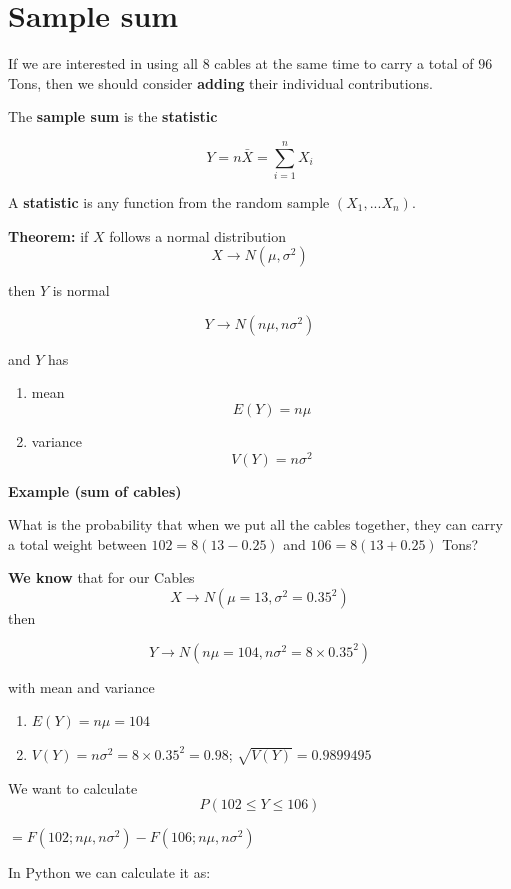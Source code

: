 \documentclass[
]{book}
\providecommand{\tightlist}{%
  \setlength{\itemsep}{0pt}\setlength{\parskip}{0pt}}
\begin{document}
\hypertarget{sample-sum}{%
\section{Sample sum}\label{sample-sum}}

If we are interested in using all \(8\) cables at the same time to carry a total of \(96\) Tons, then we should consider \textbf{adding} their individual contributions.

The \textbf{sample sum} is the \textbf{statistic}

\[Y=n \bar{X}=\sum_{i=1}^n X_i\]

A \textbf{statistic} is any function from the random sample \((X_1, ... X_n)\).

\textbf{Theorem:} if \(X\) follows a normal distribution
\[X \rightarrow N(\mu, \sigma^2)\]

then \(Y\) is normal

\[Y \rightarrow N(n\mu, n\sigma^2)\]

and \(Y\) has

\begin{enumerate}
\def\labelenumi{\arabic{enumi})}
\tightlist
\item
  mean \[E(Y)=n\mu\]
\item
  variance \[V(Y)=n\sigma^2\]
\end{enumerate}

\textbf{Example (sum of cables)}

What is the probability that when we put all the cables together, they can carry a total weight between \(102=8(13 - 0.25)\) and \(106=8(13+ 0.25)\) Tons?

\textbf{We know} that for our Cables \[X \rightarrow N(\mu=13, \sigma^2=0.35^2)\] then

\[Y \rightarrow N(n\mu=104, n\sigma^2=8\times 0.35^2)\]

with mean and variance

\begin{enumerate}
\def\labelenumi{\arabic{enumi})}
\tightlist
\item
  \(E(Y)=n\mu=104\)
\item
  \(V(Y)=n\sigma^2=8\times 0.35^2=0.98\); \(\sqrt{V(Y)}=0.9899495\)
\end{enumerate}

We want to calculate \[P(102 \leq Y \leq 106)\]

\(=F(102; n\mu, n\sigma^2)-F(106; n\mu, n\sigma^2)\)

In Python we can calculate it as:
\end{document}
